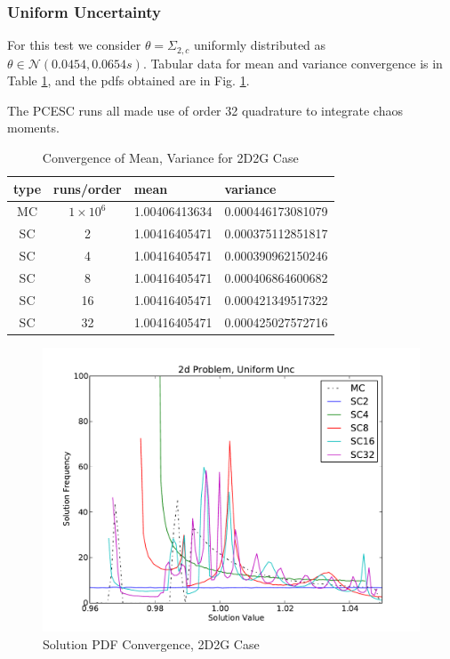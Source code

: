 \subsubsection{Uniform Uncertainty}
For this test we consider $\theta=\Sigma_{2,c}$ uniformly distributed as $\theta\in\mathcal{N}(0.0454,0.0654s)$. Tabular data for mean and variance convergence is in Table \ref{tab:2dcrit uni}, and the pdfs obtained are in Fig. \ref{fig:2dcrit uni}.

The PCESC runs all made use of order 32 quadrature to integrate chaos moments.

\begin{table}
\begin{center}
\begin{tabular}{c c|l l}
type & runs/order & mean & variance \\ \hline
MC & $1\times10^6$ & 1.00406413634 & 0.000446173081079 \\
SC & 2  & 1.00416405471 & 0.000375112851817 \\
SC & 4  & 1.00416405471 & 0.000390962150246 \\
SC & 8  & 1.00416405471 & 0.000406864600682 \\
SC & 16 & 1.00416405471 & 0.000421349517322 \\
SC & 32 & 1.00416405471 & 0.000425027572716
\end{tabular}
\end{center}
\caption{Convergence of Mean, Variance for 2D2G Case}
\label{tab:2dcrit uni}
\end{table}

\begin{figure}[h!]
\centering
   \includegraphics[width=\textwidth]{../graphics/2d_uniform_pdfs}
   \caption{Solution PDF Convergence, 2D2G Case}
   \label{fig:2dcrit uni}
\end{figure}

